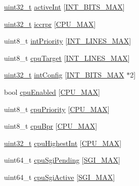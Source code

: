 \begin{DoxyCompactItemize}
\item 
\hyperlink{Type_8hh_a435d1572bf3f880d55459d9805097f62}{uint32\_\-t} \hyperlink{classPl390_a48d93d135c28a30df624e36d86856ab8}{activeInt} \mbox{[}\hyperlink{classPl390_ac0434966a31be307b3b2acd8975a169b}{INT\_\-BITS\_\-MAX}\mbox{]}
\item 
\hyperlink{Type_8hh_a435d1572bf3f880d55459d9805097f62}{uint32\_\-t} \hyperlink{classPl390_afc5683cf049c7151320031fb200a4983}{iccrpr} \mbox{[}\hyperlink{classPl390_a4b102c882c8ecd5172c3f918fcde9c6d}{CPU\_\-MAX}\mbox{]}
\item 
uint8\_\-t \hyperlink{classPl390_a4f1f81194c08a716e3583d73588952c2}{intPriority} \mbox{[}\hyperlink{classPl390_a0158de396428c6145312576a210f1a59}{INT\_\-LINES\_\-MAX}\mbox{]}
\item 
uint8\_\-t \hyperlink{classPl390_aedf9bee3143d433dfabe7bc84f574df6}{cpuTarget} \mbox{[}\hyperlink{classPl390_a0158de396428c6145312576a210f1a59}{INT\_\-LINES\_\-MAX}\mbox{]}
\item 
\hyperlink{Type_8hh_a435d1572bf3f880d55459d9805097f62}{uint32\_\-t} \hyperlink{classPl390_a0e6a663caacdba2b0b9192c0e2c8c315}{intConfig} \mbox{[}\hyperlink{classPl390_ac0434966a31be307b3b2acd8975a169b}{INT\_\-BITS\_\-MAX} $\ast$2\mbox{]}
\item 
bool \hyperlink{classPl390_aba2c5a4460094266172ecd62908b8724}{cpuEnabled} \mbox{[}\hyperlink{classPl390_a4b102c882c8ecd5172c3f918fcde9c6d}{CPU\_\-MAX}\mbox{]}
\item 
uint8\_\-t \hyperlink{classPl390_a8d3092e01e51b8ee0dd9787a9e44b795}{cpuPriority} \mbox{[}\hyperlink{classPl390_a4b102c882c8ecd5172c3f918fcde9c6d}{CPU\_\-MAX}\mbox{]}
\item 
uint8\_\-t \hyperlink{classPl390_ade84a14feb2db119b655dedf663ef829}{cpuBpr} \mbox{[}\hyperlink{classPl390_a4b102c882c8ecd5172c3f918fcde9c6d}{CPU\_\-MAX}\mbox{]}
\item 
\hyperlink{Type_8hh_a435d1572bf3f880d55459d9805097f62}{uint32\_\-t} \hyperlink{classPl390_abe05250acc13d01ea2f994f0a2f58720}{cpuHighestInt} \mbox{[}\hyperlink{classPl390_a4b102c882c8ecd5172c3f918fcde9c6d}{CPU\_\-MAX}\mbox{]}
\item 
uint64\_\-t \hyperlink{classPl390_a78fdfd8252d9d31df17bc7799f30650d}{cpuSgiPending} \mbox{[}\hyperlink{classPl390_ab882d232a4976cf54e9cb73b44e1988f}{SGI\_\-MAX}\mbox{]}
\item 
uint64\_\-t \hyperlink{classPl390_aa8be2dd249b8372cdddb56197778b7a8}{cpuSgiActive} \mbox{[}\hyperlink{classPl390_ab882d232a4976cf54e9cb73b44e1988f}{SGI\_\-MAX}\mbox{]}
\item 

\end{DoxyCompactItemize}
